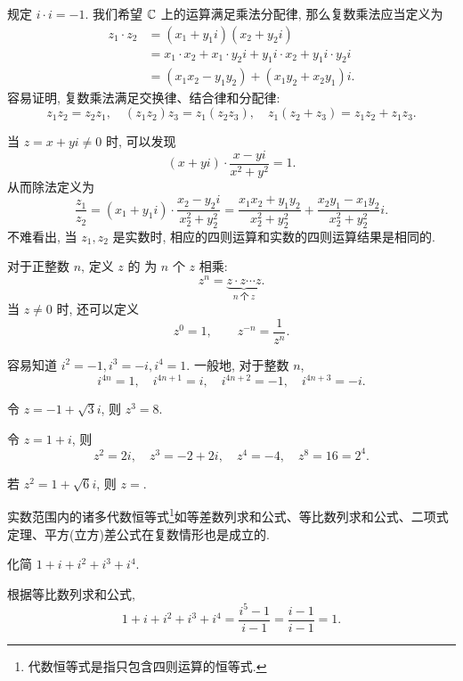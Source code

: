 \alert{规定 $i\cdot i=-1$}.
我们希望 ${\mathbb{C}}$ 上的运算满足乘法分配律, 那么复数乘法应当定义为
\begin{align*}
  z_1\cdot z_2&=(x_1+y_1i)(x_2+y_2i)\\
  &=x_1\cdot x_2+x_1\cdot y_2i+y_1i\cdot x_2+y_1i\cdot y_2i\\
  &=(x_1x_2-y_1y_2)+(x_1y_2+x_2y_1)i.
\end{align*}
容易证明, 复数乘法满足交换律、结合律和分配律:
\[
  z_1z_2=z_2z_1,\quad
  (z_1z_2) z_3=z_1(z_2 z_3),\quad
  z_1(z_2+z_3)=z_1z_2+z_1z_3.
\]

当 $z=x+yi\neq0$ 时, 可以发现
  \[(x+yi)\cdot\frac{x-yi}{x^2+y^2}=1.\]
从而除法定义为
  \[\frac{z_1}{z_2}=(x_1+y_1i)\cdot\frac{x_2-y_2i}{x_2^2+y_2^2}=\frac{x_1x_2+y_1y_2}{x_2^2+y_2^2}+\frac{x_2y_1-x_1y_2}{x_2^2+y_2^2}i.\]
不难看出, 当 $z_1,z_2$ 是实数时, 相应的四则运算和实数的四则运算结果是相同的.

对于正整数 $n$, 定义 $z$ 的 为 $n$ 个 $z$ 相乘:
\[
  z^n=\underbrace{z\cdot z\cdots z}_{n\ \text{个}\ z}.
\]
当 $z\neq 0$ 时, 还可以定义
\[
  z^0=1,\qquad
  z^{-n}=\frac1{z^n}.
\]


\begin{example}\delspace
  \begin{enumnopar}[(i)]
    \item 容易知道 $i^2=-1,i^3=-i,i^4=1$.
    一般地, 对于整数 $n$, 
    \[
      i^{4n}=1,\quad i^{4n+1}=i,\quad i^{4n+2}=-1,\quad i^{4n+3}=-i.
    \]
    \item 令 $z=-1+\sqrt 3i$, 则 $z^3=8$.
    \item 令 $z=1+i$, 则
    \[
      z^2=2i,\quad z^3=-2+2i,\quad z^4=-4,\quad z^8=16=2^4.
    \]
  \end{enumnopar}
\end{example}

\begin{exercise}
  若 $z^2=1+\sqrt6i$, 则 $z=$\fillblank{}.
\end{exercise}

实数范围内的诸多代数恒等式\footnote{
  代数恒等式是指只包含四则运算的恒等式.
}如等差数列求和公式、等比数列求和公式、二项式定理、平方(立方)差公式在复数情形也是成立的.

\begin{example}
  化简 $1+i+i^2+i^3+i^4$.
\end{example}
\begin{solution}
  根据等比数列求和公式,
  \[
     1+i+i^2+i^3+i^4
    =\frac{i^5-1}{i-1}
    =\frac{i-1}{i-1}=1.
  \]
\end{solution}

